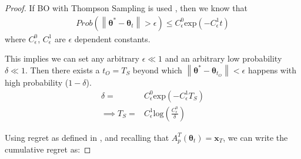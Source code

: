 \begin{proof}
If BO with Thompson Sampling is used \cite{Basu2017}, then we know that
\begin{align*}
Prob(\left\|\boldsymbol{\theta}^{*}-\boldsymbol{\theta}_{t}\right\|>\epsilon) \leq C^{0}_{\epsilon}\text{exp}(-C^{1}_{\epsilon}t)
\end{align*}
where $C^{0}_{\epsilon}$, $C^{1}_{\epsilon}$ are $\epsilon$ dependent constants.

This implies we can set any arbitrary $\epsilon \ll 1$ and an arbitrary low probability $\delta \ll 1$. Then there exists a $t_{O} = T_{S}$ beyond which $\left\|\boldsymbol{\theta}^{*}-\boldsymbol{\theta}_{t_{O}}\right\| < \epsilon$ happens with high probability ($1 - \delta$).
\begin{align*}
\delta = & C^{0}_{\epsilon}\text{exp}(-C^{1}_{\epsilon}T_{S})\\
\implies T_{S} = & C^{1}_{\epsilon}\text{log}(\frac{C^{0}_{\epsilon}}{\delta})
\end{align*}

Using regret as defined in \cite{Srinivas:2010:GPO:3104322.3104451}, and recalling that $A_{p}^{T}(\boldsymbol{\theta}_{t})=\boldsymbol{x}_{T}$, we can write the cumulative regret as:


\end{proof}
